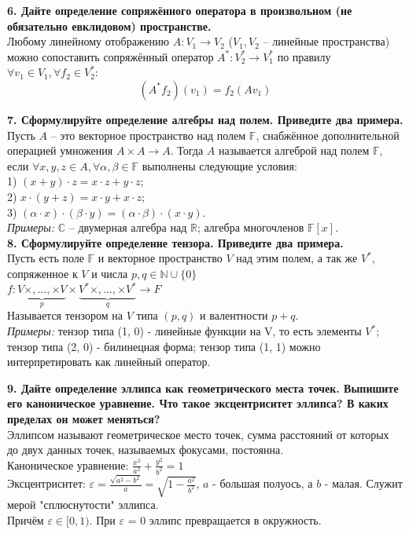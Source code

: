 \documentclass[11pt,a4paper]{article}
\renewcommand{\C}{\mathbb{C}}
\newcommand{\R}{\mathbb{R}}
\newcommand{\F}{\mathbb{F}}
\begin{document}
\textbf{6. Дайте определение сопряжённого оператора в произвольном (не обязательно евклидовом) пространстве.\\}
Любому линейному отображению $A : V_1 \rightarrow V_2$ ($V_1, V_2$ -- линейные пространства) можно сопоставить сопряжённый оператор $A^* : V_2^*\rightarrow V_1^*$ по правилу $\forall v_1 \in V_1, \forall f_2 \in V_2^*$: $$(A^* f_2)(v_1) = f_2 (A v_1)$$

\textbf{7. Сформулируйте определение алгебры над полем. Приведите два примера.\\}
Пусть $A$ -- это векторное пространство над полем $\F$, снабжённое дополнительной операцией умножения $A \times A \rightarrow A$. Тогда $A$ называется алгеброй над полем $\F$, если $\forall x, y, z \in A, \forall \alpha, \beta \in \F$ выполнены следующие условия:\\
1) $(x + y) \cdot z = x \cdot z + y \cdot z$;\\
2) $x \cdot (y + z) = x \cdot y + x \cdot z$;\\
3) $(\alpha \cdot x) \cdot (\beta \cdot y) = (\alpha \cdot \beta) \cdot (x \cdot y)$.\\
\textit{Примеры:} $\C$ -- двумерная алгебра над $\R$; алгебра многочленов $\F [x]$.\\

\textbf{8. Сформулируйте определение тензора. Приведите два примера.\\}
Пусть есть поле $\F$ и векторное пространство $V$ над этим полем, а так же $V^*$, сопряженное к $V$ и числа $p, q \in \mathbb{N} \cup \{0\}$
\\
$f: \underbrace{V \times, \dots, \times V}_{p} \times \underbrace{V^* \times, \dots, \times V^*}_{q} \to F$
\\
Называется тензором на $V$ типа $(p, q)$ и валентности $p + q$.\\
\textit{Примеры:} тензор типа (1, 0) - линейные функции на V, то есть элементы $V^*$; тензор типа (2, 0) - билинецная форма; тензор типа (1, 1) можно интерпретировать как линейный оператор.

\textbf{9. Дайте определение эллипса как геометрического места точек. Выпишите его каноническое уравнение. Что такое эксцентриситет эллипса? В каких пределах он может меняться?\\}
Эллипсом называют геометрическое место точек, сумма расстояний от которых до двух данных точек, называемых фокусами, постоянна.
\\
Каноническое уравнение: $\frac{x^2}{a^2} + \frac{y^2}{b^2} = 1$
\\
Эксцентриситет: $\varepsilon = \frac{\sqrt{a^2 - b^2}}{a} = \sqrt{1 - \frac{a^2}{b^2}}$, $a$ - большая полуось, а $b$ - малая. Служит мерой "сплюснутости" эллипса.
\\
Причём $\varepsilon \in [0, 1)$. При $\varepsilon$ = 0 эллипс превращается в окружность.
\end{document}
